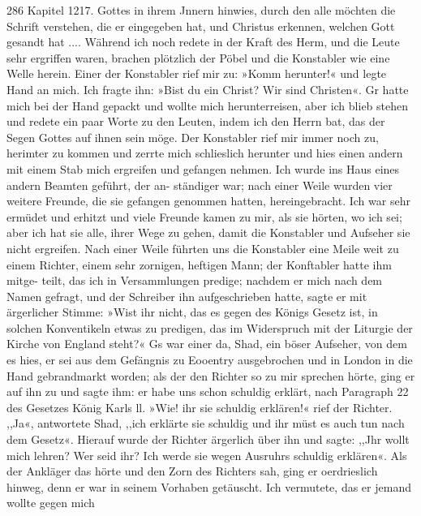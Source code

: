 286 Kapitel 1217.
Gottes in ihrem Jnnern hinwies, durch den alle möchten die
Schrift verstehen, die er eingegeben hat, und Christus erkennen,
welchen Gott gesandt hat .... Während ich noch redete in der
Kraft des Herm, und die Leute sehr ergriffen waren, brachen
plötzlich der Pöbel und die Konstabler wie eine Welle herein.
Einer der Konstabler rief mir zu: »Komm herunter!« und legte
Hand an mich. Ich fragte ihn: »Bist du ein Christ? Wir sind
Christen«. Gr hatte mich bei der Hand gepackt und wollte mich
herunterreisen, aber ich blieb stehen und redete ein paar Worte
zu den Leuten, indem ich den Herrn bat, das der Segen Gottes
auf ihnen sein möge. Der Konstabler rief mir immer noch zu,
herimter zu kommen und zerrte mich schlieslich herunter und hies
einen andern mit einem Stab mich ergreifen und gefangen nehmen.
Ich wurde ins Haus eines andern Beamten geführt, der an-
ständiger war; nach einer Weile wurden vier weitere Freunde,
die sie gefangen genommen hatten, hereingebracht. Ich war sehr
ermüdet und erhitzt und viele Freunde kamen zu mir, als sie
hörten, wo ich sei; aber ich hat sie alle, ihrer Wege zu gehen,
damit die Konstabler und Aufseher sie nicht ergreifen. Nach einer
Weile führten uns die Konstabler eine Meile weit zu einem Richter,
einem sehr zornigen, heftigen Mann; der Konftabler hatte ihm mitge-
teilt, das ich in Versammlungen predige; nachdem er mich nach dem
Namen gefragt, und der Schreiber ihn aufgeschrieben hatte, sagte er
mit ärgerlicher Stimme: »Wist ihr nicht, das es gegen des Königs
Gesetz ist, in solchen Konventikeln etwas zu predigen, das im
Widerspruch mit der Liturgie der Kirche von England steht?«
Gs war einer da, Shad, ein böser Aufseher, von dem es hies,
er sei aus dem Gefängnis zu Eooentry ausgebrochen und in
London in die Hand gebrandmarkt worden; als der den Richter
so zu mir sprechen hörte, ging er auf ihn zu und sagte ihm: er
habe uns schon schuldig erklärt, nach Paragraph 22 des Gesetzes
König Karls ll. »Wie! ihr sie schuldig erklären!« rief der
Richter. ,,Ja«, antwortete Shad, ,,ich erklärte sie schuldig
und ihr müst es auch tun nach dem Gesetz«. Hierauf wurde
der Richter ärgerlich über ihn und sagte: ,,Jhr wollt mich lehren?
Wer seid ihr? Ich werde sie wegen Ausruhrs schuldig erklären«.
Als der Ankläger das hörte und den Zorn des Richters sah,
ging er oerdrieslich hinweg, denn er war in seinem Vorhaben
getäuscht. Ich vermutete, das er jemand wollte gegen mich


